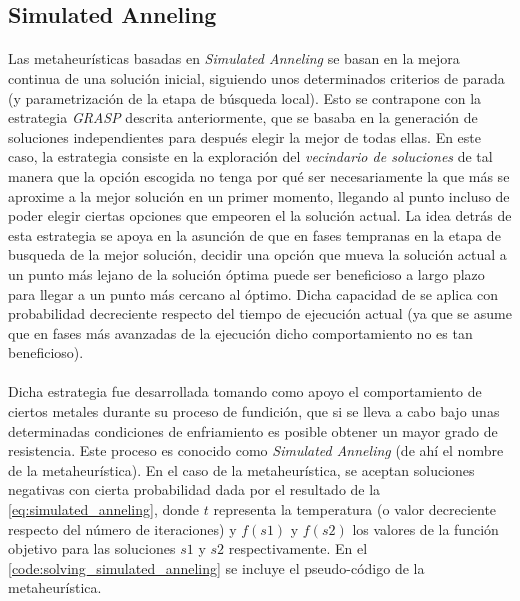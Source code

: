 \documentclass{subfiles}
\begin{document}
      \subsection{Simulated Anneling}
      \label{sec:solving_simulated_anneling}

        \paragraph{}
        Las metaheurísticas basadas en \emph{Simulated Anneling} se basan en la mejora continua de una solución inicial, siguiendo unos determinados criterios de parada (y parametrización de la etapa de búsqueda local). Esto se contrapone con la estrategia \emph{GRASP} descrita anteriormente, que se basaba en la generación de soluciones independientes para después elegir la mejor de todas ellas. En este caso, la estrategia consiste en la exploración del \emph{vecindario de soluciones} de tal manera que la opción escogida no tenga por qué ser necesariamente la que más se aproxime a la mejor solución en un primer momento, llegando al punto incluso de poder elegir ciertas opciones que empeoren el la solución actual. La idea detrás de esta estrategia se apoya en la asunción de que en fases tempranas en la etapa de busqueda de la mejor solución, decidir una opción que mueva la solución actual a un punto más lejano de la solución óptima puede ser beneficioso a largo plazo para llegar a un punto más cercano al óptimo. Dicha capacidad de  se aplica con probabilidad decreciente respecto del tiempo de ejecución actual (ya que se asume que en fases más avanzadas de la ejecución dicho comportamiento no es tan beneficioso).

        \paragraph{}
        Dicha estrategia fue desarrollada tomando como apoyo el comportamiento de ciertos metales durante su proceso de fundición, que si se lleva a cabo bajo unas determinadas condiciones de enfriamiento es posible obtener un mayor grado de resistencia. Este proceso es conocido como \emph{Simulated Anneling} (de ahí el nombre de la metaheurística). En el caso de la metaheurística, se aceptan soluciones negativas con cierta probabilidad dada por el resultado de la \cref{eq:simulated_anneling}, donde $t$ representa la temperatura (o valor decreciente respecto del número de iteraciones) y $f(s1)$ y $f(s2)$ los valores de la función objetivo para las soluciones $s1$ y $s2$ respectivamente. En el \cref{code:solving_simulated_anneling} se incluye el pseudo-código de la metaheurística.
\end{document}
